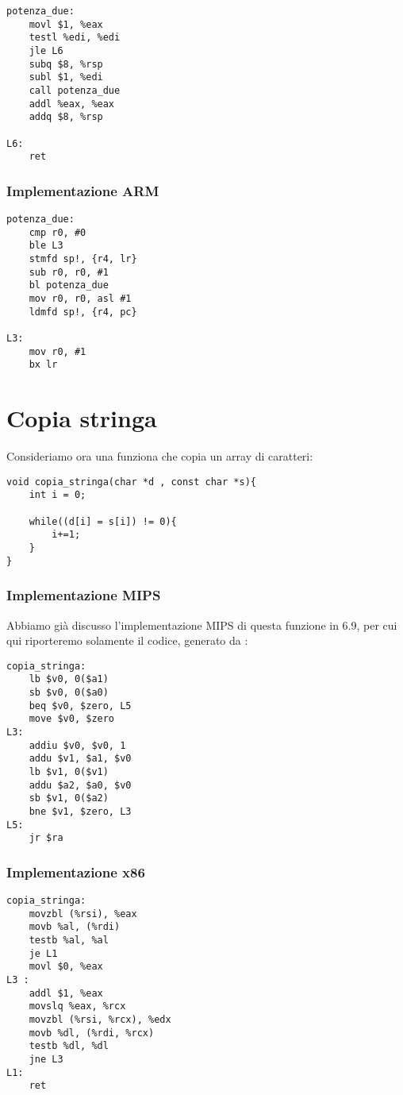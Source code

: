 \documentclass[class=book, crop=false, oneside]{standalone}
\begin{document}
\begin{verbatim}
potenza_due:
	movl $1, %eax
	testl %edi, %edi
	jle L6
	subq $8, %rsp
	subl $1, %edi
	call potenza_due
	addl %eax, %eax
	addq $8, %rsp

L6:
	ret
\end{verbatim}

\subsubsection{Implementazione ARM}

\begin{verbatim}
potenza_due:
	cmp r0, #0
	ble L3
	stmfd sp!, {r4, lr}
	sub r0, r0, #1
	bl potenza_due
	mov r0, r0, asl #1
	ldmfd sp!, {r4, pc}

L3:
	mov r0, #1
	bx lr
\end{verbatim}

\section{Copia stringa}
Consideriamo ora una funziona che copia un array di caratteri:
\begin{verbatim}
void copia_stringa(char *d , const char *s){
	int i = 0;

	while((d[i] = s[i]) != 0){
		i+=1;
	}
}
\end{verbatim}

\subsubsection{Implementazione MIPS}
Abbiamo già discusso l'implementazione MIPS di questa funzione in 6.9, per cui qui riporteremo solamente il codice, generato da :
\begin{verbatim}
copia_stringa:
	lb $v0, 0($a1)
	sb $v0, 0($a0)
	beq $v0, $zero, L5
	move $v0, $zero
L3:
	addiu $v0, $v0, 1
	addu $v1, $a1, $v0
	lb $v1, 0($v1)
	addu $a2, $a0, $v0
	sb $v1, 0($a2)
	bne $v1, $zero, L3
L5:
	jr $ra
\end{verbatim}

\subsubsection{Implementazione x86}

\begin{verbatim}
copia_stringa:
	movzbl (%rsi), %eax
	movb %al, (%rdi)
	testb %al, %al
	je L1
	movl $0, %eax
L3 :
	addl $1, %eax
	movslq %eax, %rcx
	movzbl (%rsi, %rcx), %edx
	movb %dl, (%rdi, %rcx)
	testb %dl, %dl
	jne L3
L1:
	ret
\end{verbatim}
\end{document}
